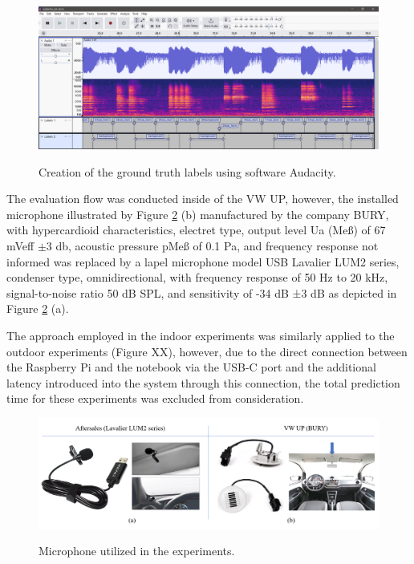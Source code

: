 \begin{figure}[htbp]
    \raggedright
        \caption{Creation of the ground truth labels using software Audacity.}
        \includegraphics[width=1\textwidth]{resources/images/050-methods/Methods_evaluation_audacity_ground_truth.png}
        \label{fig:methods_evaluation_audacity_ground_truth}
\end{figure}

The evaluation flow was conducted inside of the VW UP, however, the installed microphone illustrated by Figure \ref{fig:methods_evaluation_microphone_aftersales_and_VW_UP} (b) manufactured by the company BURY, with hypercardioid characteristics, electret type, output level Ua (Meß) of 67 mVeff $\pm$3 \gls{db}, acoustic pressure pMeß of 0.1 Pa, and frequency response not informed \cite{BURY2024} was replaced by a lapel microphone model USB Lavalier LUM2 series, condenser type, omnidirectional, with frequency response of 50 Hz to 20 kHz, signal-to-noise ratio 50 dB SPL, and sensitivity of -34 dB ±3 dB \cite{CKMOVA2021} as depicted in Figure \ref{fig:methods_evaluation_microphone_aftersales_and_VW_UP} (a).

The approach employed in the indoor experiments was similarly applied to the outdoor experiments (Figure XX), however, due to the direct connection between the Raspberry Pi and the notebook via the USB-C port and the additional latency introduced into the system through this connection, the total prediction time for these experiments was excluded from consideration.

\begin{figure}[htbp]
    \raggedright
        \caption{Microphone utilized in the experiments.}
        \includegraphics[width=1\textwidth]{resources/images/050-methods/Methods_evaluation_microphone_aftersales_VW_UP.png}
        \label{fig:methods_evaluation_microphone_aftersales_and_VW_UP}
\end{figure}

